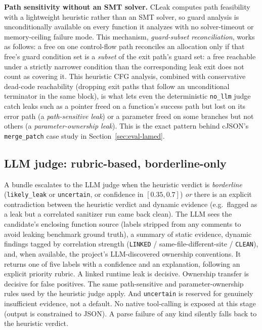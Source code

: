 \documentclass[11pt,a4paper]{article}
\begin{document}
\textbf{Path sensitivity without an SMT solver.} CLeak computes path
feasibility with a lightweight heuristic rather than an SMT solver, so
guard analysis is unconditionally available on every function it analyzes
with no solver-timeout or memory-ceiling failure mode. This mechanism,
\emph{guard-subset reconciliation}, works as follows: a free on one control-flow path
reconciles an allocation only if that free's guard condition set is a
\emph{subset} of the exit path's guard set: a free reachable under
a strictly narrower condition than the corresponding leak exit does not
count as covering it. This heuristic CFG analysis, combined with
conservative dead-code reachability (dropping exit paths that follow an
unconditional terminator in the same block), is what lets even the
deterministic \texttt{no\_llm} judge catch leaks such as a pointer freed on
a function's success path but lost on its error path (a
\emph{path-sensitive leak}) or a parameter freed on some branches but not
others (a \emph{parameter-ownership leak}). This is the exact pattern behind
cJSON's \texttt{merge\_patch} case study in
Section~\ref{sec:eval-lamed}.

\subsection{LLM judge: rubric-based, borderline-only}

A bundle escalates to the LLM judge when the heuristic verdict is
\emph{borderline} (\texttt{likely\_leak} or \texttt{uncertain}, or
confidence in $[0.35, 0.7]$) \emph{or} there is an explicit contradiction
between the heuristic verdict and dynamic evidence (e.g.\ flagged as a leak
but a correlated sanitizer run came back clean). The LLM sees the
candidate's enclosing function source (labels stripped from any comments
to avoid leaking benchmark ground truth), a summary of static evidence,
dynamic findings tagged by correlation strength
(\texttt{LINKED} / same-file-different-site / \texttt{CLEAN}), and, when
available, the project's LLM-discovered ownership conventions. It returns
one of five labels with a confidence and an explanation, following an
explicit priority rubric. A linked runtime leak is decisive. Ownership
transfer is decisive for false positives. The same path-sensitive and
parameter-ownership rules used by the heuristic judge apply. And
\texttt{uncertain} is reserved for genuinely insufficient evidence, not a
default. No native tool-calling is exposed at this stage (output is
constrained to JSON). A parse failure of any kind silently falls back to
the heuristic verdict.
\end{document}
